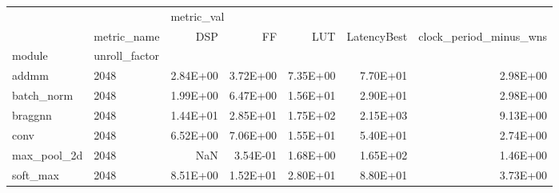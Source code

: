 \begin{tabular}{llrrrrr}
\toprule
         & {} & \multicolumn{5}{l}{metric\_val} \\
         & metric\_name &        DSP &       FF &      LUT & LatencyBest & clock\_period\_minus\_wns \\
module & unroll\_factor &            &          &          &             &                        \\
\midrule
addmm & 2048 &   2.84E+00 & 3.72E+00 & 7.35E+00 &    7.70E+01 &               2.98E+00 \\
batch\_norm & 2048 &   1.99E+00 & 6.47E+00 & 1.56E+01 &    2.90E+01 &               2.98E+00 \\
braggnn & 2048 &   1.44E+01 & 2.85E+01 & 1.75E+02 &    2.15E+03 &               9.13E+00 \\
conv & 2048 &   6.52E+00 & 7.06E+00 & 1.55E+01 &    5.40E+01 &               2.74E+00 \\
max\_pool\_2d & 2048 &        NaN & 3.54E-01 & 1.68E+00 &    1.65E+02 &               1.46E+00 \\
soft\_max & 2048 &   8.51E+00 & 1.52E+01 & 2.80E+01 &    8.80E+01 &               3.73E+00 \\
\bottomrule
\end{tabular}
